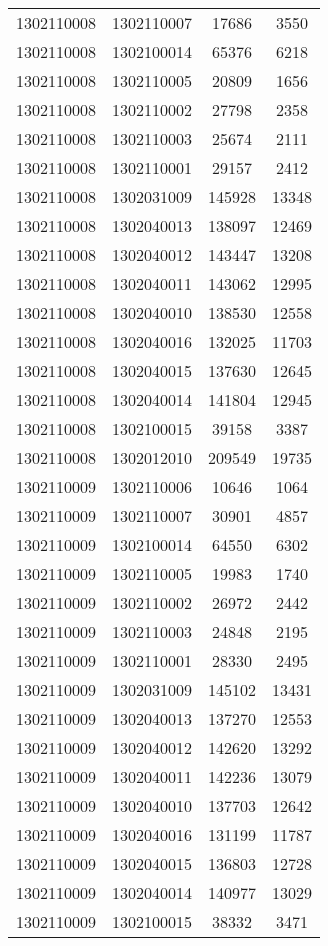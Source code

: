 \begin{longtable}{llcc}
1302110008 & 1302110007 & 17686 & 3550\\
1302110008 & 1302100014 & 65376 & 6218\\
1302110008 & 1302110005 & 20809 & 1656\\
1302110008 & 1302110002 & 27798 & 2358\\
1302110008 & 1302110003 & 25674 & 2111\\
1302110008 & 1302110001 & 29157 & 2412\\
1302110008 & 1302031009 & 145928 & 13348\\
1302110008 & 1302040013 & 138097 & 12469\\
1302110008 & 1302040012 & 143447 & 13208\\
1302110008 & 1302040011 & 143062 & 12995\\
1302110008 & 1302040010 & 138530 & 12558\\
1302110008 & 1302040016 & 132025 & 11703\\
1302110008 & 1302040015 & 137630 & 12645\\
1302110008 & 1302040014 & 141804 & 12945\\
1302110008 & 1302100015 & 39158 & 3387\\
1302110008 & 1302012010 & 209549 & 19735\\
1302110009 & 1302110006 & 10646 & 1064\\
1302110009 & 1302110007 & 30901 & 4857\\
1302110009 & 1302100014 & 64550 & 6302\\
1302110009 & 1302110005 & 19983 & 1740\\
1302110009 & 1302110002 & 26972 & 2442\\
1302110009 & 1302110003 & 24848 & 2195\\
1302110009 & 1302110001 & 28330 & 2495\\
1302110009 & 1302031009 & 145102 & 13431\\
1302110009 & 1302040013 & 137270 & 12553\\
1302110009 & 1302040012 & 142620 & 13292\\
1302110009 & 1302040011 & 142236 & 13079\\
1302110009 & 1302040010 & 137703 & 12642\\
1302110009 & 1302040016 & 131199 & 11787\\
1302110009 & 1302040015 & 136803 & 12728\\
1302110009 & 1302040014 & 140977 & 13029\\
1302110009 & 1302100015 & 38332 & 3471\\

\end{longtable}
